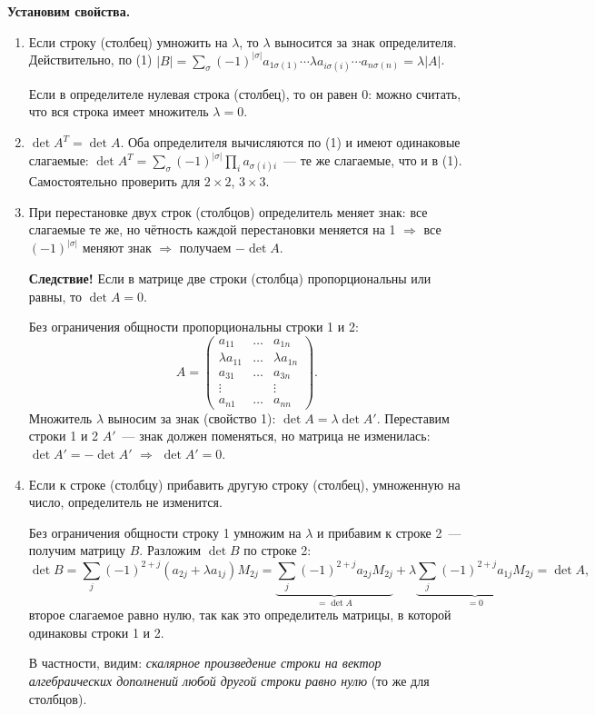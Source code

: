 \documentclass[a4paper,11pt]{article}
\begin{document}
\textbf{Установим свойства.}
\begin{enumerate}[label=\arabic*)]
\item Если строку (столбец) умножить на $\lambda$, то $\lambda$ выносится за знак определителя.
Действительно, по (1)
$|B|=\sum_\sigma(-1)^{|\sigma|}a_{1\sigma(1)}\cdots\lambda a_{i\sigma(i)}\cdots a_{n\sigma(n)}=\lambda|A|$.

Если в определителе нулевая строка (столбец), то он равен 0: можно считать, что вся строка
имеет множитель $\lambda=0$.

\item $\det A^T=\det A$. Оба определителя вычисляются по (1) и имеют одинаковые слагаемые:
$\det A^T=\sum_\sigma(-1)^{|\sigma|}\prod_{i}a_{\sigma(i)i}$~--- те же слагаемые, что и в (1).
Самостоятельно проверить для $2\times2$, $3\times3$.

\item При перестановке двух строк (столбцов) определитель меняет знак: все слагаемые те же, но
чётность каждой перестановки меняется на 1 $\Rightarrow$ все $(-1)^{|\sigma|}$ меняют знак
$\Rightarrow$ получаем $-\det A$.

\textbf{Следствие!} Если в матрице две строки (столбца) пропорциональны или равны, то $\det A=0$.

Без ограничения общности пропорциональны строки 1 и 2:
\[
A=\begin{pmatrix}a_{11}&\dots&a_{1n}\\ \lambda a_{11}&\dots&\lambda a_{1n}\\ a_{31}&\dots&a_{3n}\\
\vdots&&\vdots\\ a_{n1}&\dots&a_{nn}\end{pmatrix}.
\]
Множитель $\lambda$ выносим за знак (свойство 1): $\det A=\lambda\det A'$. Переставим строки 1 и 2
$A'$~--- знак должен поменяться, но матрица не изменилась: $\det A'=-\det A'$ $\Rightarrow$ $\det A'=0$.

\item[4)!] Если к строке (столбцу) прибавить другую строку (столбец), умноженную на число,
определитель не изменится.

Без ограничения общности строку 1 умножим на $\lambda$ и прибавим к строке 2~--- получим матрицу $B$.
Разложим $\det B$ по строке 2:
\[
\det B=\sum_{j}(-1)^{2+j}(a_{2j}+\lambda a_{1j})M_{2j}
=\underbrace{\sum_{j}(-1)^{2+j}a_{2j}M_{2j}}_{=\det A}
+\lambda\underbrace{\sum_{j}(-1)^{2+j}a_{1j}M_{2j}}_{=0}=\det A,
\]
второе слагаемое равно нулю, так как это определитель матрицы, в которой одинаковы строки 1 и 2.

В частности, видим: \emph{скалярное произведение строки на вектор алгебраических дополнений любой
другой строки равно нулю} (то же для столбцов).
\end{enumerate}
\end{document}
